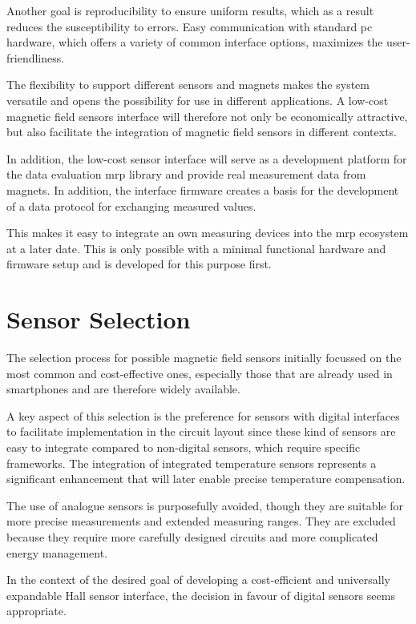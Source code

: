 Another goal is reproducibility to ensure uniform results, which as a
result reduces the susceptibility to errors. Easy communication with
standard \gls{pc} hardware, which offers a variety of common interface
options, maximizes the user-friendliness.

The flexibility to support different sensors and magnets makes the
system versatile and opens the possibility for use in different
applications. A low-cost magnetic field sensors interface will therefore
not only be economically attractive, but also facilitate the integration
of magnetic field sensors in different contexts.

In addition, the low-cost sensor interface will serve as a development
platform for the data evaluation \gls{mrp} library and provide real
measurement data from magnets. In addition, the interface firmware
creates a basis for the development of a data protocol for exchanging
measured values.

This makes it easy to integrate an own measuring devices into the
\gls{mrp} ecosystem at a later date. This is only possible with a
minimal functional hardware and firmware setup and is developed for this
purpose first.

\hypertarget{sensor-selection}{%
\section{Sensor Selection}\label{sensor-selection}}

The selection process for possible magnetic field sensors initially
focussed on the most common and cost-effective ones, especially those
that are already used in smartphones and are therefore widely available.

A key aspect of this selection is the preference for sensors with
digital interfaces to facilitate implementation in the circuit layout
since these kind of sensors are easy to integrate compared to
non-digital sensors, which require specific frameworks. The integration
of integrated temperature sensors represents a significant enhancement
that will later enable precise temperature compensation.

The use of analogue sensors is purposefully avoided, though they are
suitable for more precise measurements and extended measuring ranges.
They are excluded because they require more carefully designed circuits
and more complicated energy management.

In the context of the desired goal of developing a cost-efficient and
universally expandable Hall sensor interface, the decision in favour of
digital sensors seems appropriate.

